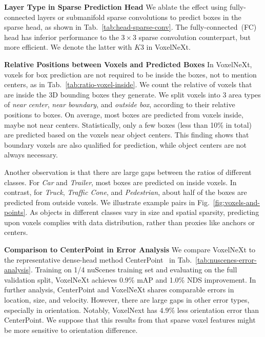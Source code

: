 \documentclass[10pt,twocolumn,letterpaper]{article}
\begin{document}
\vspace{0.5em}
\noindent
\textbf{Layer Type in Sparse Prediction Head}
We ablate the effect using fully-connected layers or submanifold sparse convolutions to predict boxes in the sparse head, as shown in Tab.~\ref{tab:head-sparse-conv}. The fully-connected~(FC) head has inferior performance to the $3\times 3$ sparse convolution counterpart, but more efficient. We denote the latter with $K3$ in VoxelNeXt. 

\vspace{0.5em}
\noindent
\textbf{Relative Positions between Voxels and Predicted Boxes}
In VoxelNeXt, voxels for box prediction are not required to be inside the boxes, not to mention centers, as in Tab.~\ref{tab:ratio-voxel-inside}. We count the relative of voxels that are inside the 3D bounding boxes they generate. We split voxels into 3 area types of {\em near center}, {\em near boundary}, and {\em outside box}, according to their relative positions to boxes. On average, most boxes are predicted from voxels inside, maybe not near centers. Statistically, only a few boxes (less than 10\% in total) are predicted based on the voxels near object centers. This finding shows that boundary voxels are also qualified for prediction, while object centers are not always necessary.

Another observation is that there are large gaps between the ratios of different classes. For {\em Car} and {\em Trailer}, most boxes are predicted on inside voxels. In contrast, for {\em Truck}, {\em Traffic Cone}, and {\em Pedestrian}, about half of the boxes are predicted from outside voxels. We illustrate example pairs in Fig.~\ref{fig:voxels-and-points}. As objects in different classes vary in size and spatial sparsity, predicting upon voxels complies with data distribution, rather than proxies like anchors or centers.

\vspace{0.5em}
\noindent
\textbf{Comparison to CenterPoint in Error Analysis}
We compare VoxelNeXt to the representative dense-head method
CenterPoint~\cite{centerpoint} in Tab.~\ref{tab:nuscenes-error-analysis}. Training on 1/4 nuScenes training set and evaluating on the full validation split, VoxelNeXt achieves 0.9\% mAP and 1.0\% NDS improvement. In further analysis, CenterPoint and VoxelNeXt shares comparable errors in location, size, and velocity. However, there are large gaps in other error types, especially in orientation. Notably, VoxelNext has 4.9\% less orientation error than CenterPoint. We suppose that this results from that sparse voxel features might be more sensitive to orientation difference.
\end{document}
